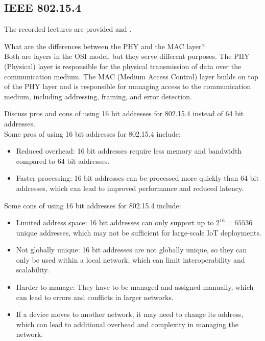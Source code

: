 \newpage\subsection{IEEE 802.15.4}

The recorded lectures are provided  and .

\begin{ejercicio}
    What are the differences between the PHY and the MAC layer?\\

    Both are layers in the OSI model, but they serve different purposes. The PHY (Physical) layer is responsible for the physical transmission of data over the communication medium. The MAC (Medium Access Control) layer builds on top of the PHY layer and is responsible for managing access to the communication medium, including addressing, framing, and error detection.
\end{ejercicio}

\begin{ejercicio}
    Discuss pros and cons of using 16 bit addresses for 802.15.4 instead of 64 bit addresses.\\

    Some pros of using 16 bit addresses for 802.15.4 include:
    \begin{itemize}
        \item Reduced overhead: 16 bit addresses require less memory and bandwidth compared to 64 bit addresses.
        \item Faster processing: 16 bit addresses can be processed more quickly than 64 bit addresses, which can lead to improved performance and reduced latency.
    \end{itemize}

    Some cons of using 16 bit addresses for 802.15.4 include:
    \begin{itemize}
        \item Limited address space: 16 bit addresses can only support up to $2^{16} = 65536$ unique addresses, which may not be sufficient for large-scale IoT deployments.
        \item Not globally unique: 16 bit addresses are not globally unique, so they can only be used within a local network, which can limit interoperability and scalability.
        \item Harder to manage: They have to be managed and assigned manually, which can lead to errors and conflicts in larger networks.
        \item If a device moves to another network, it may need to change its address, which can lead to additional overhead and complexity in managing the network.
    \end{itemize}
\end{ejercicio}


